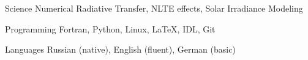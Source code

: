 

\begin{cvskills}

  \cvskill
    {Science} %
    {Numerical Radiative Transfer, NLTE effects, Solar Irradiance Modeling} %

  \cvskill
    {Programming} %
    {Fortran, Python, Linux, LaTeX, IDL, Git} %

  \cvskill
    {Languages} %
    {Russian (native), English (fluent), German (basic)} %

\end{cvskills}

